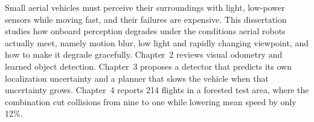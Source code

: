 Small aerial vehicles must perceive their surroundings with light, low-power sensors while
moving fast, and their failures are expensive. This dissertation studies how onboard perception
degrades under the conditions aerial robots actually meet, namely motion blur, low light and
rapidly changing viewpoint, and how to make it degrade gracefully. Chapter~2 reviews visual
odometry and learned object detection. Chapter~3 proposes a detector that predicts its own
localization uncertainty and a planner that slows the vehicle when that uncertainty grows.
Chapter~4 reports 214 flights in a forested test area, where the combination cut collisions from
nine to one while lowering mean speed by only 12\%.
